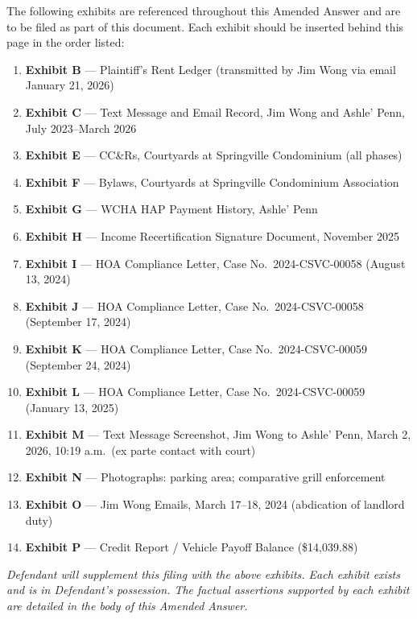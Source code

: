 \documentclass[12pt,letterpaper]{article}
\begin{document}
\noindent The following exhibits are referenced throughout this Amended Answer and are to be filed as part of this document. Each exhibit should be inserted behind this page in the order listed:

\begin{enumerate}
  \item \textbf{Exhibit B} --- Plaintiff's Rent Ledger (transmitted by Jim Wong via email January 21, 2026)
  \item \textbf{Exhibit C} --- Text Message and Email Record, Jim Wong and Ashle' Penn, July 2023--March 2026
  \item \textbf{Exhibit E} --- CC\&Rs, Courtyards at Springville Condominium (all phases)
  \item \textbf{Exhibit F} --- Bylaws, Courtyards at Springville Condominium Association
  \item \textbf{Exhibit G} --- WCHA HAP Payment History, Ashle' Penn
  \item \textbf{Exhibit H} --- Income Recertification Signature Document, November 2025
  \item \textbf{Exhibit I} --- HOA Compliance Letter, Case No.\ 2024-CSVC-00058 (August 13, 2024)
  \item \textbf{Exhibit J} --- HOA Compliance Letter, Case No.\ 2024-CSVC-00058 (September 17, 2024)
  \item \textbf{Exhibit K} --- HOA Compliance Letter, Case No.\ 2024-CSVC-00059 (September 24, 2024)
  \item \textbf{Exhibit L} --- HOA Compliance Letter, Case No.\ 2024-CSVC-00059 (January 13, 2025)
  \item \textbf{Exhibit M} --- Text Message Screenshot, Jim Wong to Ashle' Penn, March 2, 2026, 10:19 a.m.\ (ex parte contact with court)
  \item \textbf{Exhibit N} --- Photographs: parking area; comparative grill enforcement
  \item \textbf{Exhibit O} --- Jim Wong Emails, March 17--18, 2024 (abdication of landlord duty)
  \item \textbf{Exhibit P} --- Credit Report / Vehicle Payoff Balance (\$14,039.88)
\end{enumerate}

\vspace{12pt}
\noindent\textit{Defendant will supplement this filing with the above exhibits. Each exhibit exists and is in Defendant's possession. The factual assertions supported by each exhibit are detailed in the body of this Amended Answer.}
\end{document}
